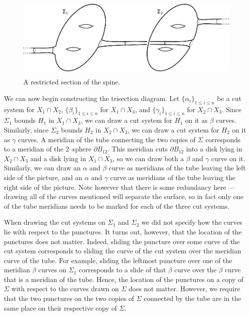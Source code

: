 \documentclass[12pt]{amsart}
\newcommand{\del}{\partial }
\theoremstyle{definition}
\theoremstyle{remark}
\begin{document}
\begin{figure}[h]
\centering
\includegraphics[height=1.6in]{coresubsurface.png}
\caption{A restricted section of the spine.}
\label{fig_coresubsurface}
\end{figure}

We can now begin constructing the trisection diagram.  Let $\{\alpha_i\}_{1 \le i \le n}$ be a cut system for $X_1 \cap X_2$, $\{\beta_i\}_{1 \le i \le n}$ for $X_1 \cap X_3$, and $\{\gamma_i\}_{1 \le i \le n}$ for $X_2 \cap X_3$.  Since $\Sigma_1$ bounds $H_1$ in $X_1 \cap X_3$, we can draw a cut system for $H_1$ on it as $\beta$ curves.  Similarly, since $\Sigma_2$ bounds $H_2$ in $X_2 \cap X_3$, we can draw a cut system for $H_2$ on it as $\gamma$ curves.  A meridian of the tube connecting the two copies of $\Sigma$ corresponds to a meridian of the 2--sphere $\del B_{12}$.  This meridian cuts $\del B_{12}$ into a disk lying in $X_2 \cap X_3$ and a disk lying in $X_1 \cap X_3$, so we can draw both a $\beta$ and $\gamma$ curve on it.  Similarly, we can draw an $\alpha$ and $\beta$ curve as meridians of the tube leaving the left side of the picture, and an $\alpha$ and $\gamma$ curve as meridians of the tube leaving the right side of the picture.  Note however that there is some redundancy here --- drawing all of the curves mentioned will separate the surface, so in fact only one of the tube meridians needs to be marked for each of the three cut systems.

When drawing the cut systems on $\Sigma_1$ and $\Sigma_2$ we did not specify how the curves lie with respect to the punctures.  It turns out, however, that the location of the punctures does not matter.  Indeed, sliding the puncture over some curve of the cut system corresponds to sliding the curve of the cut system over the meridian curve of the tube.  For example, sliding the leftmost puncture over one of the meridian $\beta$ curves on $\Sigma_1$ corresponds to a slide of that $\beta$ curve over the $\beta$ curve that is a meridian of the tube.  Hence, the location of the punctures on a copy of $\Sigma$ with respect to the curves drawn on $\Sigma$ does not matter.  However, we require that the two punctures on the two copies of $\Sigma$ connected by the tube are in the same place on their respective copy of $\Sigma$.  
\end{document}
